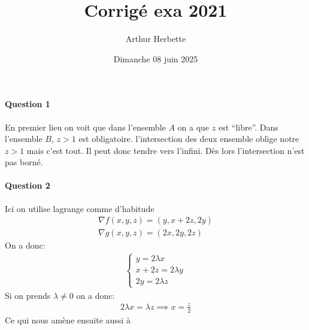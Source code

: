 \documentclass[a4paper]{article}
\title{Corrigé exa 2021}
\author{Arthur Herbette}
\date{Dimanche 08 juin 2025}
\begin{document}
\maketitle
\paragraph{Question 1}
En premier lieu on voit que dans l'ensemble $A$ on a que $z$ est ``libre''. Dans l'ensemble $B$, $z > 1$ est obligatoire. l'intersection des deux ensemble oblige notre $z > 1$ mais c'est tout. Il peut donc tendre vers l'infini. Dès lors l'intersection n'est pas borné.\\
\paragraph{Question 2}
Ici on utilise lagrange comme d'habitude\\
\begin{align*} 
    \nabla f\left(x, y, z\right) = \left(y, x + 2z, 2y\right)\\
    \nabla g \left(x, y, z\right) = \left(2x, 2y, 2z\right)
\end{align*}
On a donc:
\begin{align*} 
    \begin{cases}
        y =  2\lambda x\\
        x + 2z = 2\lambda y\\
        2y = 2\lambda z
    \end{cases} 
\end{align*}
Si on prends $\lambda \neq 0$ on a donc:
\begin{align*} 
    2\lambda x =  \lambda z \implies x =  \frac{z}{2}
\end{align*}
Ce qui nous amène ensuite aussi à
\end{document}
